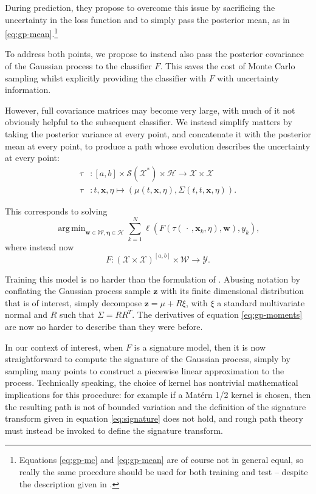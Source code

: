 \documentclass{article}
\DeclareMathOperator*{\argmin}{arg\,min}
\newcommand{\dataspace}{\mathcal{X}}
\newcommand{\lspace}{\mathcal{Y}}
\newcommand{\seriesspace}{\mathcal{S}}
\begin{document}
During prediction, they propose to overcome this issue by sacrificing the uncertainty in the loss function and to simply pass the posterior mean, as in \eqref{eq:gp-mean}.\footnote{Equations \eqref{eq:gp-mc} and \eqref{eq:gp-mean} are of course not in general equal, so really the same procedure should be used for both training and test -- despite the description given in \cite[Section 3.1]{li2016scalable}.}

To address both points, we propose to instead also pass the posterior covariance of the Gaussian process to the classifier $F$. This saves the cost of Monte Carlo sampling whilst explicitly providing the classifier with $F$ with uncertainty information.

However, full covariance matrices may become very large, with much of it not obviously helpful to the subsequent classifier. We instead simplify matters by taking the posterior variance at every point, and concatenate it with the posterior mean at every point, to produce a path whose evolution describes the uncertainty at every point:
\begin{align*}
    \tau &\colon [a, b] \times \seriesspace(\dataspace^*) \times \mathcal{H} \to \dataspace \times \dataspace\\
    \tau &\colon t, \mathbf{x}, \eta \mapsto (\mu(t, \mathbf{x}, \eta), \Sigma(t, t, \mathbf{x}, \eta)).
\end{align*}

This corresponds to solving
\begin{equation}\label{eq:gp-moments}
\argmin_{\mathbf{w} \in \mathcal{W},\bm{\eta} \in \mathcal{H}} \sum_{k=1}^N \ell(F(\tau(\,\cdot\,,\mathbf{x}_k, \eta), \mathbf{w}), y_k),
\end{equation}
where instead now
\begin{equation*}
    F \colon (\dataspace \times \dataspace)^{[a, b]} \times \mathcal{W} \to \lspace.
\end{equation*}

Training this model is no harder than the formulation of \cite{li2016scalable}. Abusing notation by conflating the Gaussian process sample $\mathbf{z}$ with its finite dimensional distribution that is of interest, simply decompose $\mathbf{z} = \mu + R \xi$, with $\xi$ a standard multivariate normal and $R$ such that $\Sigma = RR^T$. The derivatives of equation \eqref{eq:gp-moments} are now no harder to describe than they were before.

In our context of interest, when $F$ is a signature model, then it is now straightforward to compute the signature of the Gaussian process, simply by sampling many points to construct a piecewise linear approximation to the process. Technically speaking, the choice of kernel has nontrivial mathematical implications for this procedure: for example if a Mat{\'e}rn 1/2 kernel is chosen, then the resulting path is not of bounded variation and the definition of the signature transform given in equation \eqref{eq:signature} does not hold, and rough path theory \cite{lyons1998differential} must instead be invoked to define the signature transform.
\end{document}
